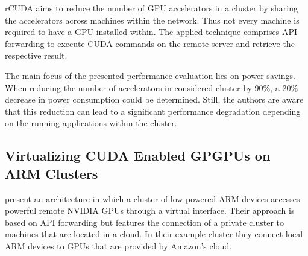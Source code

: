 rCUDA aims to reduce the number of GPU accelerators in a cluster by sharing the accelerators across machines within the network\cite{rcuda}. Thus not every machine is required to have a GPU installed within. The applied technique comprises API forwarding to execute CUDA commands on the remote server and retrieve the respective result.

The main focus of the presented performance evaluation lies on power savings. When reducing the number of accelerators in considered cluster by 90\%, a 20\% decrease in power consumption could be determined. Still, the authors are aware that this reduction can lead to a significant performance degradation depending on the running applications within the cluster.

\subsection*{Virtualizing CUDA Enabled GPGPUs on ARM Clusters}

\citeauthor{arm_virtual_cuda} present an architecture in which a cluster of low powered ARM devices accesses powerful remote NVIDIA GPUs through a virtual interface\cite{arm_virtual_cuda}. Their approach is based on API forwarding but features the connection of a private cluster to machines that are located in a cloud. In their example cluster they connect local ARM devices to GPUs that are provided by Amazon's cloud.
